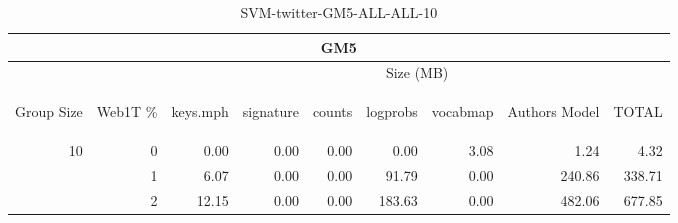 \begin{center}
\begin{table}[htbp] 
 \begin{center}
\begin{tabular}{ | r | r | r | r | r | r | r | r | r |}
\hline
\multicolumn{9}{|c|}{GM5}\\
\hline
 & & \multicolumn{7}{|c|}{Size (MB)}\\ \cline{3-9}
\begin{sideways}Group Size\end{sideways} & \begin{sideways}Web1T \% \end{sideways} & \begin{sideways}keys.mph\end{sideways} & \begin{sideways}signature\end{sideways} & \begin{sideways}counts\end{sideways} & \begin{sideways}logprobs\end{sideways} & \begin{sideways}vocabmap\end{sideways} & \begin{sideways}Authors Model \end{sideways} & \begin{sideways}TOTAL\end{sideways}\\
\hline
\multirow{2}{*}{10}
 & 0 & 0.00 & 0.00 & 0.00 & 0.00 & 3.08 & 1.24 & 4.32\\ \cline{2-9}
 & 1 & 6.07 & 0.00 & 0.00 & 91.79 & 0.00 & 240.86 & 338.71\\ \cline{2-9}
 & 2 & 12.15 & 0.00 & 0.00 & 183.63 & 0.00 & 482.06 & 677.85\\ \cline{2-9}
\hline
\end{tabular}
\caption{SVM-twitter-GM5-ALL-ALL-10}
\label{table:SVM-twitter-GM5-ALL-ALL-10}
\end{center}
 \end{table}
\end{center}

